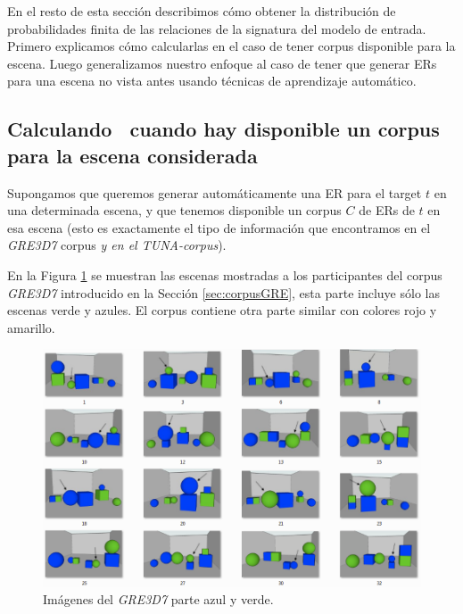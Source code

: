 En el resto de esta secci\'on describimos c\'omo obtener la distribuci\'on de probabilidades finita de las relaciones de la signatura del modelo de entrada. Primero explicamos c\'omo calcularlas en el caso de tener corpus disponible para la escena. Luego generalizamos nuestro enfoque al caso de tener que generar ERs para una escena no vista antes usando t\'ecnicas de aprendizaje autom\'atico.  


\subsection{Calculando \puse\ cuando hay disponible un corpus para la escena considerada}
\label{sec:learning-corpus}

Supongamos que queremos generar autom\'aticamente una ER para el target $t$ en una
determinada escena, y que tenemos disponible un corpus $C$ de ERs de $t$
en esa escena (esto es exactamente el tipo de informaci\'on que encontramos en el
\textit{GRE3D7} corpus \textit{y en el TUNA-corpus}).

En la Figura \ref{verde-azul} se muestran las escenas mostradas a los participantes del corpus \textit{GRE3D7} introducido en la Secci\'on \ref{sec:corpusGRE}, esta parte incluye s\'olo las escenas verde y azules. El corpus contiene otra parte similar con colores rojo y amarillo.

\begin{figure}[H]
\centering
\includegraphics[width=1\textwidth]{images/corpusVerdeAzul.png}
\caption{Im\'agenes del \textit{GRE3D7} parte azul y verde.}
\label{verde-azul}
\end{figure}

